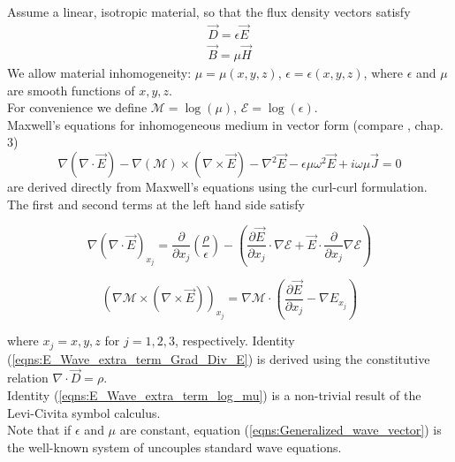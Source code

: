 \documentclass[twocolumn,secnumarabic,amssymb, nobibnotes, aps, prd]{revtex4-1}
\begin{document}
Assume a linear, isotropic material, so that the flux density vectors satisfy
\begin{subequations}
\begin{align}
        \overrightarrow{D} = \epsilon \overrightarrow{E} \label{eqns:constitutiveDepsE}\\
        \overrightarrow{B} = \mu \overrightarrow{H}	\label{eqns:constitutiveBH}        
\end{align}
\end{subequations}
We allow material inhomogeneity: $\mu=\mu(x,y,z)$, $\epsilon = \epsilon(x,y,z)$, where $\epsilon$ and $\mu$ are smooth functions of $x,y,z$.\\ 
For convenience we define $\mathcal{M} = \log(\mu)$, $\mathcal{E} = \log(\epsilon)$. \\
Maxwell's equations for inhomogeneous medium in vector form (compare \cite{goodman2005introduction}, chap. 3) 
\begin{equation}
\label{eqns:Generalized_wave_vector}
\nabla (\nabla \cdot \overrightarrow{E})-\nabla(\mathcal{M}) \times \left(\nabla \times \overrightarrow{E} \right) - \nabla^2 \overrightarrow{E} -\epsilon \mu \omega^2 \overrightarrow{E} + i \omega \mu \overrightarrow{J} = 0
\end{equation}
are derived directly from Maxwell's equations using the curl-curl formulation. The first and second terms at the left hand side satisfy

\begin{equation}
\nabla \left( \nabla \cdot \overrightarrow{E} \right)_{x_j} = \frac{\partial}{\partial x_j}\left( \frac{\rho}{\epsilon}\right) - \left(\frac{\partial \overrightarrow{E}}{\partial x_j} \cdot \nabla \mathcal{E} + \overrightarrow{E} \cdot \frac{\partial}{\partial x_j} \nabla \mathcal{E} \right)
\label{eqns:E_Wave_extra_term_Grad_Div_E} 
\end{equation}

\begin{equation}
\left(\nabla \mathcal{M} \times \left(\nabla \times \overrightarrow{E} \right) \right)_{x_j} = 
\nabla \mathcal{M} \cdot \left( \frac{\partial \overrightarrow{E}}{\partial x_j}- \nabla E_{x_j} \right)
\label{eqns:E_Wave_extra_term_log_mu}
\end{equation}

where $x_j = x,y,z$ for $j=1,2,3$, respectively. Identity (\ref{eqns:E_Wave_extra_term_Grad_Div_E}) is derived using the constitutive relation
$\nabla \cdot \overrightarrow{D} = \rho$. \\
Identity (\ref{eqns:E_Wave_extra_term_log_mu}) is a non-trivial result of the Levi-Civita symbol calculus.\\
Note that if $\epsilon$ and $\mu$ are constant, equation (\ref{eqns:Generalized_wave_vector}) is the well-known system of uncouples standard wave equations.
\end{document}
